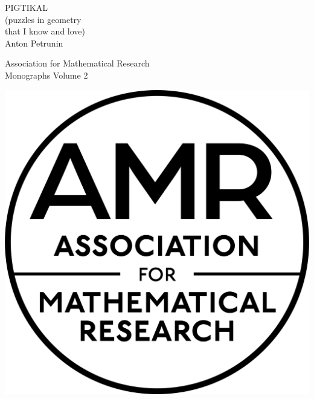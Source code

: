\documentclass[twoside]{book}
\newcommand{\arxiv}[2]{#1} %
\begin{document}


\begin{titlepage}
\selectfont  
    \vspace*{4.5\baselineskip}
    \centering

\centering
\vspace*{3mm}
{\huge PIGTIKAL} \\[0em]
{\huge (puzzles in geometry\\
that I know and love)}\\[14mm]
{\Large Anton Petrunin} 
\par
\vspace*{55mm}
{\large Association for Mathematical Research\\[0mm]
Monographs Volume 2}
\par
\vspace*{14mm}
\arxiv{\includegraphics[angle=0, scale=.17]{cover/amr-small.png}}{\texttt{[image: cover/amr-small.jpg]}}
\end{titlepage}
\end{document}
